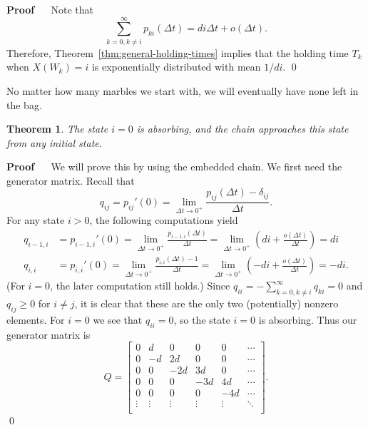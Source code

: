 \documentclass[12pt]{article}
\renewenvironment{proof}{%
\begin{adjustwidth}{\parindent}{\parindent}
{\bf Proof} \ \ 
}{\qed
\end{adjustwidth}}
\newtheorem{thm}{Theorem}[section]
\theoremstyle{definition}
\begin{document}
\begin{proof}
Note that $$\sum_{k = 0, k \neq i}^\infty p_{ki}(\Delta t) = di \Delta t +
o(\Delta t).$$ Therefore, Theorem~\ref{thm:general-holding-times} implies that
the holding time $T_k$ when $X(W_k) = i$ is exponentially distributed with mean
$1/di$.
\end{proof}

No matter how many marbles we start with, we will eventually have none left in
the bag.

\begin{thm}
    \label{thm:limit-behavior}
    The state $i = 0$ is absorbing, and the chain approaches this state from
    any initial state.
\end{thm}

\begin{proof}
We will prove this by using the embedded chain. We first need the generator
matrix. Recall that $$q_{ij} = p_{ij}'(0) = \lim_{\Delta t \to 0^+}
\frac{p_{ij}(\Delta t) - \delta_{ij}}{\Delta t}.$$ For any state $i > 0$, the
following computations yield
\begin{align*}
    q_{i - 1, i} &= p_{i - 1, i}'(0)
        = \lim_{\Delta t \to 0^+} \frac{p_{i - 1, i}(\Delta t)}{\Delta t}
        = \lim_{\Delta t \to 0^+}
            \left( di + \frac{o(\Delta t)}{\Delta t} \right) = di \\
%
    q_{i, i} &= p_{i, i}'(0)
        = \lim_{\Delta t \to 0^+} \frac{p_{i, i}(\Delta t) - 1}{\Delta t}
        = \lim_{\Delta t \to 0^+}
            \left( -di + \frac{o(\Delta t)}{\Delta t} \right) = -di.
\end{align*}
(For $i = 0$, the later computation still holds.) Since $q_{ii} = -\sum_{k = 0,
k \neq i}^\infty q_{ki} = 0$ and $q_{ij} \geq 0$ for $i \neq j$, it is clear
that these are the only two (potentially) nonzero elements. For $i = 0$ we see
that $q_{ii} = 0$, so the state $i = 0$ is absorbing. Thus our generator matrix
is \[ Q =
    \begin{bmatrix}
        0 & d & 0 & 0 & 0 & \cdots \\
        0 & -d & 2d & 0 & 0 & \cdots \\
        0 & 0 & -2d & 3d & 0 & \cdots \\
        0 & 0 & 0 & -3d & 4d & \cdots \\
        0 & 0 & 0 & 0 & -4d & \cdots \\
        \vdots & \vdots & \vdots & \vdots & \vdots & \ddots \\
    \end{bmatrix}.
\]
\end{proof}
\end{document}
